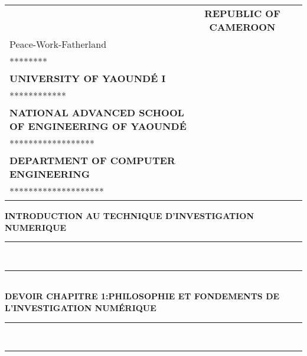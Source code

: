 \documentclass[12pt,a4paper]{article}
\begin{document}
\begin{titlepage}
\begin{table}[h]
\begin{tabular}{p{7.5cm}c p{7.1cm}}
				&
				
				\centering
				\textbf{REPUBLIC OF CAMEROON}\\
				Peace-Work-Fatherland\\ 
				********\\[0.2cm]
				\textbf{UNIVERSITY OF YAOUNDÉ I}\\
				************\\[0.2cm]
				\textbf{NATIONAL ADVANCED SCHOOL OF ENGINEERING OF YAOUNDÉ}\\
				******************\\[0.2cm]
				\textbf{DEPARTMENT OF COMPUTER ENGINEERING}\\
				********************
			\end{tabular}
		\end{table}
		
		\begin{center}
			\begin{tcolorbox}[
				colback=blue!80,   %
				colframe=blue!80,  %
				arc=6mm,           %
				boxrule=0pt,       %
				width=0.6\textwidth,
				halign=center
				]
				{\color{black}\bfseries  INTRODUCTION AU TECHNIQUE D'INVESTIGATION NUMERIQUE}
			\end{tcolorbox}
		\end{center}
		
		\vspace{0.05cm}
		
		\begin{center}
			\rule{12cm}{3pt} \\[0.00001mm]
			\rule{18cm}{1pt} \\[0.4cm]
			{\Large \bfseries DEVOIR CHAPITRE 1:PHILOSOPHIE ET FONDEMENTS DE L'INVESTIGATION NUMÉRIQUE} \\[0.0001cm] 
			\rule{18cm}{1pt} \\[0.00001mm]
			\rule{12cm}{3pt} \\[0.5cm]
		\end{center}
		
		\begin{center}
			

\end{center}
\end{titlepage}
\end{document}
